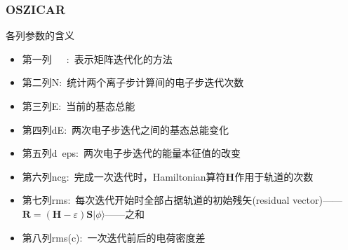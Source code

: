 \frame
{
	\frametitle{\textrm{OSZICAR}}
	各列参数的含义
\begin{itemize}
	\item 第一列~~~:~表示矩阵迭代化的方法
	\item 第二列\textrm{N}:~统计两个离子步计算间的电子步迭代次数
	\item 第三列\textrm{E}:~当前的基态总能
	\item 第四列\textrm{dE}:~两次电子步迭代之间的基态总能变化
	\item 第五列\textrm{d~eps}:~两次电子步迭代的能量本征值的改变%
	\item 第六列\textrm{ncg}:~完成一次迭代时，\textrm{Hamiltonian}算符\textbf{H}作用于轨道的次数~
	\item 第七列\textrm{rms}:~每次迭代开始时全部占据轨道的初始残矢\textrm{(residual vector)}——$\mathbf{R}=(\mathbf{H}-\varepsilon)\mathbf{S}|\phi\rangle$——之和\\{\fontsize{7.0pt}{5.2pt}\selectfont{该值表明轨道的收敛情形的优劣}}
	\item 第八列\textrm{rms(c)}:~一次迭代前后的电荷密度差
\end{itemize}
}

